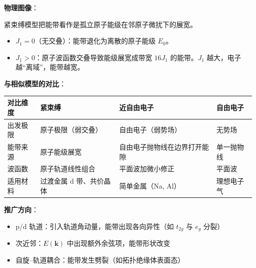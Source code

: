 \begin{insightbox}[物理图像与模型关联]
\textbf{物理图像}：

紧束缚模型把能带看作是孤立原子能级在邻原子微扰下的展宽。
\begin{itemize}[nosep]
    \item $J_1=0$（无交叠）：能带退化为离散的原子能级 $E_0$。
    \item $J_1>0$：原子波函数交叠导致能级展宽成带宽 $16J_1$ 的能带。$J_1$ 越大，电子越``离域''，能带越宽。
\end{itemize}

\textbf{与相似模型的对比}：
\begin{center}
\begin{tabular}{llll}
\toprule
\textbf{对比维度} & \textbf{紧束缚} & \textbf{近自由电子} & \textbf{自由电子} \\
\midrule
出发极限 & 原子极限（弱交叠） & 自由电子（弱势场） & 无势场 \\
能带来源 & 原子能级展宽 & 自由电子抛物线在边界打开能隙 & 单一抛物线 \\
波函数 & 原子轨道线性组合 & 平面波加微小修正 & 平面波 \\
适用材料 & 过渡金属 d 带、共价晶体 & 简单金属（Na, Al） & 理想电子气 \\
\bottomrule
\end{tabular}
\end{center}

\textbf{推广方向}：
\begin{itemize}[nosep]
    \item p/d 轨道：引入轨道角动量，能带出现各向异性（如 $t_{2g}$ 与 $e_g$ 分裂）
    \item 次近邻：$E(\mathbf{k})$ 中出现额外余弦项，能带形状改变
    \item 自旋--轨道耦合：能带发生劈裂（如拓扑绝缘体表面态）
\end{itemize}
\end{insightbox}

